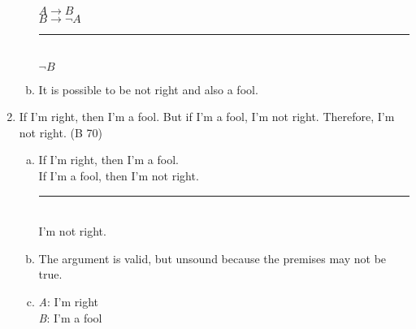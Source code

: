 \documentclass{article}
\begin{document}
\begin{enumerate}
\begin{enumerate}[(a)]
                        $A \to B$\\
                        $B \to \neg A$\\
                        \rule{5em}{.5pt}\\
                        $\neg B$
                        \setcounter{enumii}{4}
                  \item  It is possible to be not right and also a fool.
            \end{enumerate}
      \item If I'm right, then I'm a fool. But if I'm a fool, I'm not right. Therefore, I'm not right. (B 70)
            \begin{enumerate}[(a)]
                  \item If I'm right, then I'm a fool.\\
                        If I'm a fool, then I'm not right.\\
                        \rule{15em}{.5pt}\\
                        I'm not right.
                  \item The argument is valid, but unsound because the premises may not be true.\\
                  \item \textit{A}: I'm right\\
                        \textit{B}: I'm a fool\\


\end{enumerate}
\end{enumerate}
\end{document}

